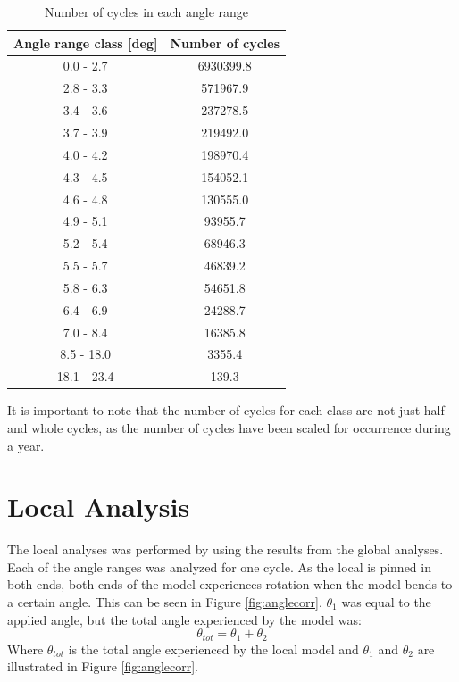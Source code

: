 \begin{table} [H]
\centering
\begin{tabular}{ |c|c|}
\hline
Angle range class [deg] & Number of cycles \\
 \hline
 \hline
0.0 - 2.7 & 6930399.8\\

2.8 - 3.3 & 571967.9\\
 
3.4 - 3.6 & 237278.5 \\
 
3.7 - 3.9& 219492.0  \\

4.0 - 4.2& 198970.4  \\

4.3  - 4.5 & 154052.1  \\

4.6 - 4.8 & 130555.0 \\

4.9 - 5.1 & 93955.7 \\

5.2 - 5.4 & 68946.3 \\

5.5 - 5.7 & 46839.2 \\

5.8 - 6.3 & 54651.8 \\

6.4 - 6.9 & 24288.7 \\

7.0 - 8.4 & 16385.8 \\

8.5 - 18.0 & 3355.4 \\

18.1 - 23.4 & 139.3  \\

 \hline
\end{tabular}
\caption{Number of cycles in each angle range}
\label{table:angleclass}
\end{table} 
\noindent It is important to note that the number of cycles for each class are not just half and whole cycles, as the number of cycles have been scaled for occurrence during a year.\newline 
\newline

\section{Local Analysis}
The local analyses was performed by using the results from the global analyses. Each of the angle ranges was analyzed for one cycle. As the local is pinned in both ends, both ends of the model experiences rotation when the model bends to a certain angle. This can be seen in Figure \ref{fig:anglecorr}. $\theta_1$ was equal to the applied angle, but the total angle experienced by the model was:
\begin{equation}
    \theta_{tot}=\theta_1 + \theta_2
\end{equation}
Where $\theta_{tot}$ is the total angle experienced by the local model and $\theta_1$ and $\theta_2$ are illustrated in Figure \ref{fig:anglecorr}.

